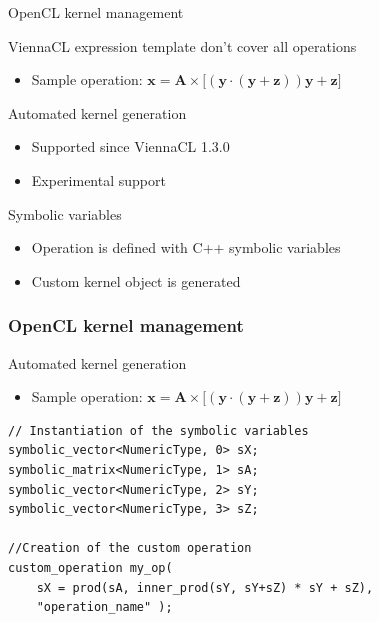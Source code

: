 \begin{frame}{OpenCL kernel management}

\begin{block}{ViennaCL expression template don't cover all operations}
  \begin{itemize}
    \item Sample operation: $\mathbf{x} = \mathbf{A} \times \bigl[ (\mathbf{y} \cdot (\mathbf{y}+\mathbf{z}))\mathbf{y} + \mathbf{z} \bigr]$
  \end{itemize}
\end{block}

\begin{block}{Automated kernel generation}
  \begin{itemize}
    \item Supported since ViennaCL 1.3.0
    \item Experimental support
  \end{itemize}
\end{block}

\begin{block}{Symbolic variables}
  \begin{itemize}
    \item Operation is defined with C++ symbolic variables
    \item Custom kernel object is generated
  \end{itemize}
\end{block}

\end{frame}



\begin{frame}[fragile]
\frametitle{OpenCL kernel management}

\begin{block}{Automated kernel generation}
  \begin{itemize}
    \item Sample operation: $\mathbf{x} = \mathbf{A} \times \bigl[ (\mathbf{y} \cdot (\mathbf{y}+\mathbf{z}))\mathbf{y} + \mathbf{z} \bigr]$
  \end{itemize}
  \begin{lstlisting}
// Instantiation of the symbolic variables
symbolic_vector<NumericType, 0> sX;
symbolic_matrix<NumericType, 1> sA;
symbolic_vector<NumericType, 2> sY;
symbolic_vector<NumericType, 3> sZ;

//Creation of the custom operation
custom_operation my_op(
    sX = prod(sA, inner_prod(sY, sY+sZ) * sY + sZ),
    "operation_name" );
  \end{lstlisting}
\end{block}

\end{frame}



